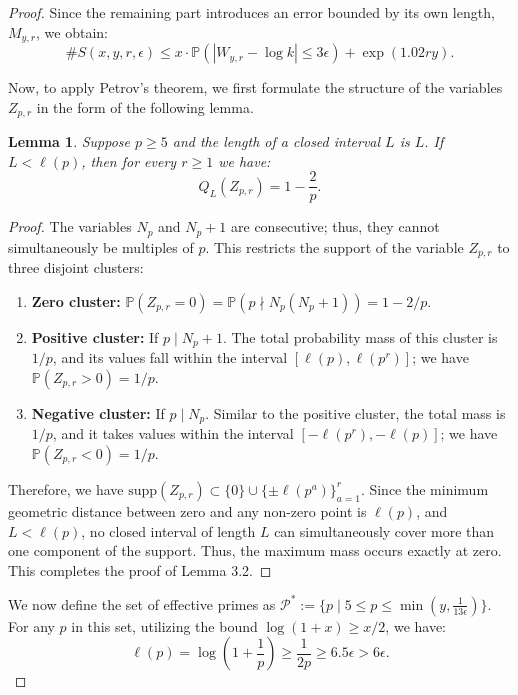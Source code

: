 \documentclass[10pt,a4paper]{amsart}
\newtheorem{lemma}{Lemma}
\begin{document}
\begin{proof}
Since the remaining part introduces an error bounded by its own length, $M_{y,r}$, we obtain:
\begin{equation}
\text{\#}S(x, y, r, \epsilon) \leq x \cdot \mathbb{P}(|W_{y,r} - \log k| \leq 3\epsilon) + \exp(1.02ry). \label{eq:2}
\end{equation}

Now, to apply Petrov's theorem, we first formulate the structure of the variables $Z_{p,r}$ in the form of the following lemma.

\begin{lemma}
Suppose $p \geq 5$ and the length of a closed interval $L$ is $L$. If $L < \ell(p)$, then for every $r \geq 1$ we have:
\[ Q_L(Z_{p,r}) = 1 - \frac{2}{p}. \]
\end{lemma}

\begin{proof}
The variables $N_p$ and $N_p + 1$ are consecutive; thus, they cannot simultaneously be multiples of $p$. This restricts the support of the variable $Z_{p,r}$ to three disjoint clusters:
\begin{enumerate}
    \item \textbf{Zero cluster:} $\mathbb{P}(Z_{p,r} = 0) = \mathbb{P}(p \nmid N_p(N_p + 1)) = 1 - 2/p$.
    \item \textbf{Positive cluster:} If $p \mid N_p + 1$. The total probability mass of this cluster is $1/p$, and its values fall within the interval $[\ell(p), \ell(p^r)]$; we have $\mathbb{P}(Z_{p,r} > 0) = 1/p$.
    \item \textbf{Negative cluster:} If $p \mid N_p$. Similar to the positive cluster, the total mass is $1/p$, and it takes values within the interval $[-\ell(p^r), -\ell(p)]$; we have $\mathbb{P}(Z_{p,r} < 0) = 1/p$.
\end{enumerate}

Therefore, we have $\text{supp}(Z_{p,r}) \subset \{0\} \cup \{\pm \ell(p^a)\}_{a=1}^r$. Since the minimum geometric distance between zero and any non-zero point is $\ell(p)$, and $L < \ell(p)$, no closed interval of length $L$ can simultaneously cover more than one component of the support. Thus, the maximum mass occurs exactly at zero. This completes the proof of Lemma 3.2.
\end{proof}

We now define the set of effective primes as $\mathcal{P}^* := \{p \mid 5 \leq p \leq \min(y, \frac{1}{13\epsilon})\}$. For any $p$ in this set, utilizing the bound $\log(1 + x) \geq x/2$, we have:
\[ \ell(p) = \log \left(1 + \frac{1}{p}\right) \geq \frac{1}{2p} \geq 6.5\epsilon > 6\epsilon. \]


\end{proof}
\end{document}
